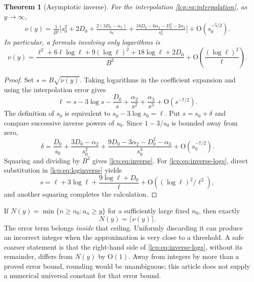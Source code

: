 \documentclass[11pt]{article}
\numberwithin{equation}{section}
\newtheorem{theorem}{Theorem}[section]
\theoremstyle{definition}\newtheorem{definition}[theorem]{Definition}
\theoremstyle{remark}\newtheorem{remark}[theorem]{Remark}
\newcommand{\OO}{\mathrm O}
\begin{document}
\begin{theorem}[Asymptotic inverse]\label{lcp:thm:inverse}
For the interpolation \eqref{lcp:eq:interpolation}, as $y\to\infty$,
\begin{align}\label{lcp:eq:inverse}
 \nu(y)=\frac1{B^2}\bigg[
 s_0^2+2D_0+\frac{2(3D_0-\alpha_2)}{s_0}
 +\frac{18D_0-6\alpha_2-D_0^2-2\alpha_3}{s_0^2}
 \bigg]+\OO(s_0^{-5/2}).
\end{align}
In particular, a formula involving only logarithms is
\begin{equation}\label{lcp:eq:inverse-logs}
 \nu(y)=\frac{\ell^2+6\ell\log\ell+9(\log\ell)^2
                    +18\log\ell+2D_0}{B^2}
       +\OO\!\left(\frac{(\log\ell)^2}{\ell}\right).
\end{equation}
\end{theorem}
\begin{proof}
Set $s=B\sqrt{\nu(y)}$. Taking logarithms in the coefficient expansion
and using the interpolation error gives
\begin{equation}\label{lcp:eq:loginverse}
 \ell=s-3\log s-\frac{D_0}{s}
             +\frac{\alpha_2}{s^2}+\frac{\alpha_3}{s^3}
             +\OO(s^{-7/2}).
\end{equation}
The definition of $s_0$ is equivalent to
$s_0-3\log s_0=\ell$.
Put $s=s_0+\delta$ and compare successive inverse powers of $s_0$.
Since $1-3/s_0$ is bounded away from zero,
\[
 \delta=\frac{D_0}{s_0}
 +\frac{3D_0-\alpha_2}{s_0^2}
 +\frac{9D_0-3\alpha_2-D_0^2-\alpha_3}{s_0^3}
 +\OO(s_0^{-7/2}).
\]
Squaring and dividing by $B^2$ gives \eqref{lcp:eq:inverse}.
For \eqref{lcp:eq:inverse-logs}, direct substitution in
\eqref{lcp:eq:loginverse} yields
\[
 s=\ell+3\log\ell+\frac{9\log\ell+D_0}{\ell}
       +\OO((\log\ell)^2/\ell^2),
\]
and another squaring completes the calculation.
\end{proof}

If $N(y)=\min\{n\ge n_0:a_n\ge y\}$ for a sufficiently large fixed
$n_0$, then exactly
\[
 N(y)=\lceil\nu(y)\rceil.
\]
The error term belongs \emph{inside} that ceiling. Uniformly discarding
it can produce an incorrect integer when the approximation is very close
to a threshold. A safe coarser statement is that the right-hand side of
\eqref{lcp:eq:inverse-logs}, without its remainder, differs from $N(y)$ by
$\OO(1)$. Away from integers by more than a proved error bound, rounding
would be unambiguous; this article does not supply a numerical universal
constant for that error bound.
\end{document}
